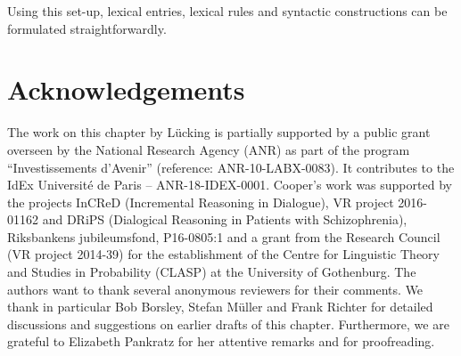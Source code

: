 \documentclass[output=paper
 	        ,biblatex
                ,babelshorthands
                ,newtxmath
                ,draftmode
                ,colorlinks, citecolor=brown
]{langscibook}
\begin{document}
Using this set-up, lexical entries, lexical rules and syntactic constructions can be formulated straightforwardly. 


 
\section*{Acknowledgements}


The work on this chapter by Lücking is partially supported by a public grant overseen by the  National Research Agency (ANR) as part of the program ``Investissements d'Avenir'' (reference: ANR-10-LABX-0083). It contributes to the IdEx Université de Paris -- ANR-18-IDEX-0001. Cooper's work was supported by the projects InCReD (Incremental Reasoning in Dialogue), VR project 2016-01162 and DRiPS (Dialogical Reasoning in Patients with Schizophrenia), Riksbankens jubileumsfond, P16-0805:1 and a grant from the  Research Council (VR project 2014-39) for the establishment of the Centre for Linguistic Theory and Studies in Probability (CLASP) at the University of Gothenburg. The authors want to thank several anonymous reviewers for their comments. We thank in particular Bob Borsley, Stefan Müller and Frank Richter for detailed discussions and suggestions on earlier drafts of this chapter. Furthermore, we are grateful to Elizabeth Pankratz for her attentive remarks and for proofreading.


{\sloppy
\printbibliography[heading=subbibliography,notkeyword=this]
}
\end{document}
